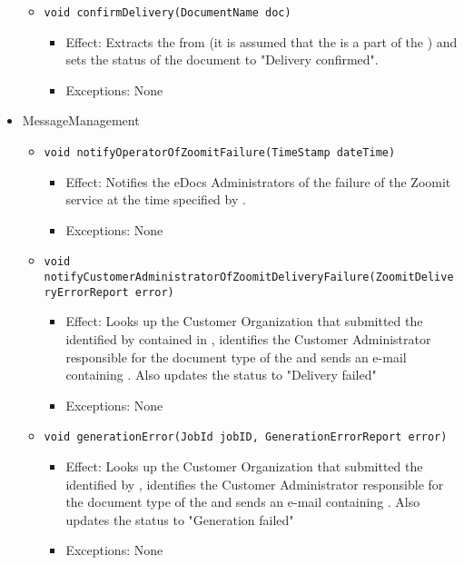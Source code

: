 \begin{itemize}
\begin{itemize}
		\item \texttt{void confirmDelivery(DocumentName doc)}
        \begin{itemize}
            \item Effect: Extracts the  from  (it is assumed that the  is a part of the ) and sets the status of the document to "Delivery confirmed".
            \item Exceptions: None
        \end{itemize}
    \end{itemize}

	\item MessageManagement
    \begin{itemize}
        \item \texttt{void notifyOperatorOfZoomitFailure(TimeStamp dateTime)}
        \begin{itemize}
            \item Effect: Notifies the eDocs Administrators of the failure of the Zoomit service at the time specified by .
            \item Exceptions: None
        \end{itemize}
		
		\item \texttt{void notifyCustomerAdministratorOfZoomitDeliveryFailure(ZoomitDeliveryErrorReport error)}
        \begin{itemize}
            \item Effect: Looks up the Customer Organization that submitted the  identified by  contained in , identifies the Customer Administrator responsible for the document type of the  and sends an e-mail containing . Also updates the status to "Delivery failed"
            \item Exceptions: None
        \end{itemize}

        \item \texttt{void generationError(JobId jobID, GenerationErrorReport error)}
		    \begin{itemize}
                \item Effect: Looks up the Customer Organization that submitted the  identified by , identifies the Customer Administrator responsible for the document type of the  and sends an e-mail containing . Also updates the status to "Generation failed"
                \item Exceptions: None
            \end{itemize}


\end{itemize}
\end{itemize}
